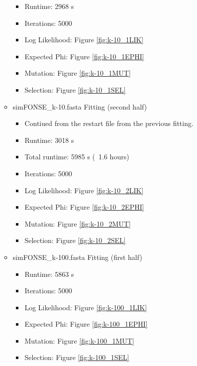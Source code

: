 \documentclass[11pt]{labbook}
\begin{document}
\begin{itemize}
\begin{itemize}
                    \begin{itemize}
                        \item Runtime: 2968 s
                        \item Iterations: 5000
                        \item Log Likelihood: Figure \ref{fig:k-10_1LIK}
                        \item Expected Phi: Figure \ref{fig:k-10_1EPHI}
                        \item Mutation: Figure \ref{fig:k-10_1MUT}
                        \item Selection: Figure \ref{fig:k-10_1SEL}
                    \end{itemize}
                \item simFONSE\_k-10.fasta Fitting (second half)
                    \begin{itemize}
                        \item Contiued from the restart file from the previous fitting.
                        \item Runtime: 3018 s
                        \item Total runtime: 5985 s (~1.6 hours)
                        \item Iterations: 5000
                        \item Log Likelihood: Figure \ref{fig:k-10_2LIK}
                        \item Expected Phi: Figure \ref{fig:k-10_2EPHI}
                        \item Mutation: Figure \ref{fig:k-10_2MUT}
                        \item Selection: Figure \ref{fig:k-10_2SEL}
                    \end{itemize}
                \item simFONSE\_k-100.fasta Fitting (first half)
                    \begin{itemize}
                        \item Runtime: 5863 s
                        \item Iterations: 5000
                         \item Log Likelihood: Figure \ref{fig:k-100_1LIK}
                        \item Expected Phi: Figure \ref{fig:k-100_1EPHI}
                        \item Mutation: Figure \ref{fig:k-100_1MUT}
                        \item Selection: Figure \ref{fig:k-100_1SEL}

\end{itemize}
\end{itemize}
\end{itemize}
\end{document}
